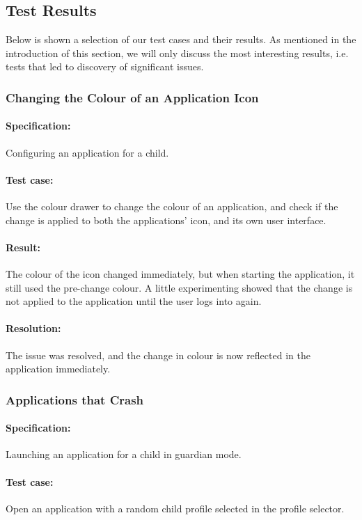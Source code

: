 \subsection{Test Results}\label{sec:sprint1:testing_results}
Below is shown a selection of our test cases and their results.
As mentioned in the introduction of this section, we will only discuss the most interesting results, i.e. tests that led to discovery of significant issues.


\subsubsection{Changing the Colour of an Application Icon}

\paragraph{Specification:} Configuring an application for a child.
\paragraph{Test case:} Use the colour drawer to change the colour of an application, and check if the change is applied to both the applications' icon, and its own user interface.
\paragraph{Result:} The colour of the icon changed immediately, but when starting the application, it still used the pre-change colour. A little experimenting showed that the change is not applied to the application until the user logs into \launcher again.
\paragraph{Resolution:} The issue was resolved, and the change in colour is now reflected in the application immediately.

\subsubsection{Applications that Crash \launcher}

\paragraph{Specification:} Launching an application for a child in guardian mode.
\paragraph{Test case:} Open an application with a random child profile selected in the profile selector.
